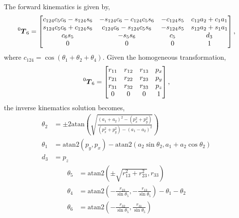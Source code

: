 \documentclass[12pt]{article}
\newenvironment{problem}[2][Problem]{\begin{trivlist}
\item[\hskip \labelsep {\bfseries #1}\hskip \labelsep {\bfseries #2.}]}{\end{trivlist}}
\begin{document}
\begin{problem}{1}
The forward kinematics is given by,
\begin{align*}
    \prescript{0}{}{\boldsymbol{T}}_6 = \begin{bmatrix}
        c_{124}c_5c_6-s_{124}s_6 & -s_{124}c_6-c_{124}c_5s_6 & -c_{124}s_5 & c_{12}a_2+c_1a_1 \\
        s_{124}c_5c_6+c_{124}s_6 & c_{124}c_6-s_{124}c_5s_6  & -s_{124}s_5 & s_{12}a_2+s_1a_1 \\
        c_6s_5                   & -s_5s_6                   & c_5         & d_3              \\
        0                        & 0                         & 0           & 1
    \end{bmatrix},
\end{align*}
where $c_{124} = \cos(\theta_1 + \theta_2 + \theta_4)$. Given the homogeneous transformation, 
\begin{align*}
    \prescript{0}{}{\boldsymbol{T}}_6 = \begin{bmatrix}
        r_{11} & r_{12} & r_{13} & p_x \\
        r_{21} & r_{22} & r_{23} & p_y \\
        r_{31} & r_{32} & r_{33} & p_z \\
        0      & 0      & 0      & 1
    \end{bmatrix},
\end{align*}
the inverse kinematics solution becomes,
\begin{align*}
    \theta_2 & = \pm 2\mathrm{atan} \left( \sqrt{\frac{(a_1+a_2)^2-(p_x^2+p_y^2)}{(p_x^2+p_y^2)-(a_1-a_2)^2}}  \right)\\
    \theta_1 & = \mathrm{atan2}(p_y,p_x) - \mathrm{atan2}(a_2 \sin \theta_2, a_1+a_2 \cos \theta_2)\\
    d_3 & = p_z
\end{align*}
\begin{align*}
    \theta_5 & = \mathrm{atan2} \left( \pm \sqrt{r_{13}^2+r_{23}^2}, r_{33}  \right)\\
    \theta_4 & = \mathrm{atan2} \left(-\frac{r_{23}}{\sin \theta_5}, -\frac{r_{13}}{\sin \theta_5}  \right) - \theta_1 - \theta_2\\
    \theta_6 & = \mathrm{atan2} \left(-\frac{r_{32}}{\sin \theta_5}, \frac{r_{31}}{\sin \theta_5}  \right)
\end{align*}


\end{problem}
\end{document}
